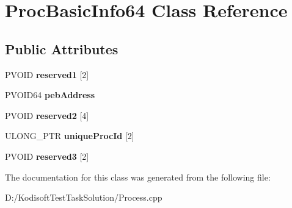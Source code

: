 \hypertarget{class_proc_basic_info64}{\section{Proc\+Basic\+Info64 Class Reference}
\label{class_proc_basic_info64}
}
\subsection*{Public Attributes}
\begin{DoxyCompactItemize}
\item 
\hypertarget{class_proc_basic_info64_a8d09585a76052477e004ec3d720ca43b}{P\+V\+O\+I\+D {\bfseries reserved1} \mbox{[}2\mbox{]}}\label{class_proc_basic_info64_a8d09585a76052477e004ec3d720ca43b}

\item 
\hypertarget{class_proc_basic_info64_a8ba8a78d3e4856afb06ab06da4cd5095}{P\+V\+O\+I\+D64 {\bfseries peb\+Address}}\label{class_proc_basic_info64_a8ba8a78d3e4856afb06ab06da4cd5095}

\item 
\hypertarget{class_proc_basic_info64_a97e1c32701aea7fff91692c1f45995b0}{P\+V\+O\+I\+D {\bfseries reserved2} \mbox{[}4\mbox{]}}\label{class_proc_basic_info64_a97e1c32701aea7fff91692c1f45995b0}

\item 
\hypertarget{class_proc_basic_info64_a4552cbfe1db0846f87e83daeff8fe106}{U\+L\+O\+N\+G\+\_\+\+P\+T\+R {\bfseries unique\+Proc\+Id} \mbox{[}2\mbox{]}}\label{class_proc_basic_info64_a4552cbfe1db0846f87e83daeff8fe106}

\item 
\hypertarget{class_proc_basic_info64_ad5e162e794b8065d58db9ab4d6d27175}{P\+V\+O\+I\+D {\bfseries reserved3} \mbox{[}2\mbox{]}}\label{class_proc_basic_info64_ad5e162e794b8065d58db9ab4d6d27175}

\end{DoxyCompactItemize}


The documentation for this class was generated from the following file\+:\begin{DoxyCompactItemize}
\item 
D\+:/\+Kodisoft\+Test\+Task\+Solution/Process.\+cpp\end{DoxyCompactItemize}
